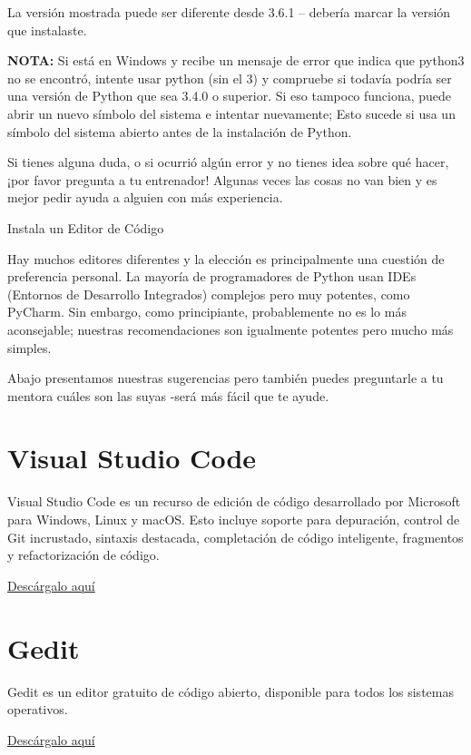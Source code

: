\documentclass[
  a4paper,
  DIV=11,
  numbers=noendperiod,
  onepage,
  openany]{scrreprt}
\begin{document}
La versión mostrada puede ser diferente desde 3.6.1 -- debería marcar la
versión que instalaste.

\textbf{NOTA:} Si está en Windows y recibe un mensaje de error que
indica que python3 no se encontró, intente usar python (sin el 3) y
compruebe si todavía podría ser una versión de Python que sea 3.4.0 o
superior. Si eso tampoco funciona, puede abrir un nuevo símbolo del
sistema e intentar nuevamente; Esto sucede si usa un símbolo del sistema
abierto antes de la instalación de Python.

Si tienes alguna duda, o si ocurrió algún error y no tienes idea sobre
qué hacer, ¡por favor pregunta a tu entrenador! Algunas veces las cosas
no van bien y es mejor pedir ayuda a alguien con más experiencia.

Instala un Editor de Código

Hay muchos editores diferentes y la elección es principalmente una
cuestión de preferencia personal. La mayoría de programadores de Python
usan IDEs (Entornos de Desarrollo Integrados) complejos pero muy
potentes, como PyCharm. Sin embargo, como principiante, probablemente no
es lo más aconsejable; nuestras recomendaciones son igualmente potentes
pero mucho más simples.

Abajo presentamos nuestras sugerencias pero también puedes preguntarle a
tu mentora cuáles son las suyas -será más fácil que te ayude.

\chapter{Visual Studio Code}\label{visual-studio-code}

Visual Studio Code es un recurso de edición de código desarrollado por
Microsoft para Windows, Linux y macOS. Esto incluye soporte para
depuración, control de Git incrustado, sintaxis destacada, completación
de código inteligente, fragmentos y refactorización de código.

\href{https://code.visualstudio.com/download}{Descárgalo aquí}

\chapter{Gedit}\label{gedit}

Gedit es un editor gratuito de código abierto, disponible para todos los
sistemas operativos.

\href{https://gedit-technology.github.io/apps/gedit/}{Descárgalo aquí}
\end{document}
